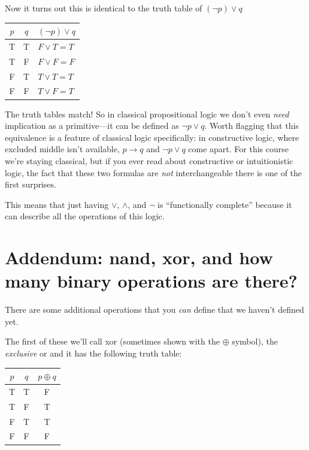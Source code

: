 \documentclass[11pt]{article}
\begin{document}
Now it turns out this is identical to the truth table of $(\lnot p) \vee q$

\begin{center}
\begin{tabular}{cc|l}
\toprule
$p$ & $q$ & $(\lnot p) \vee q$ \\
\midrule
T & T & $F \vee T = T$ \\
T & F & $F \vee F = F$ \\
F & T & $T \vee T = T$ \\
F & F & $T \vee F = T$ \\
\bottomrule
\end{tabular}
\end{center}

The truth tables match! So in classical propositional logic we don't even \emph{need} implication as a primitive---it can be defined as $\lnot p \vee q$. Worth flagging that this equivalence is a feature of classical logic specifically: in constructive logic, where excluded middle isn't available, $p \to q$ and $\lnot p \vee q$ come apart. For this course we're staying classical, but if you ever read about constructive or intuitionistic logic, the fact that these two formulas are \emph{not} interchangeable there is one of the first surprises.

This means that just having $\vee$, $\wedge$, and $\lnot$ is ``functionally complete'' because it can describe all the operations of this logic.

\section{Addendum: nand, xor, and how many binary operations are there?}
There are some additional operations that you \emph{can} define that we haven't defined yet.

The first of these we'll call xor (sometimes shown with the $\oplus$ symbol), the \emph{exclusive} or and it has the following truth table:

\begin{center}
\begin{tabular}{cc|c}
\toprule
$p$ & $q$ & $p \oplus q$ \\
\midrule
T & T & F \\
T & F & T \\
F & T & T \\
F & F & F \\
\bottomrule
\end{tabular}
\end{center}
\end{document}
